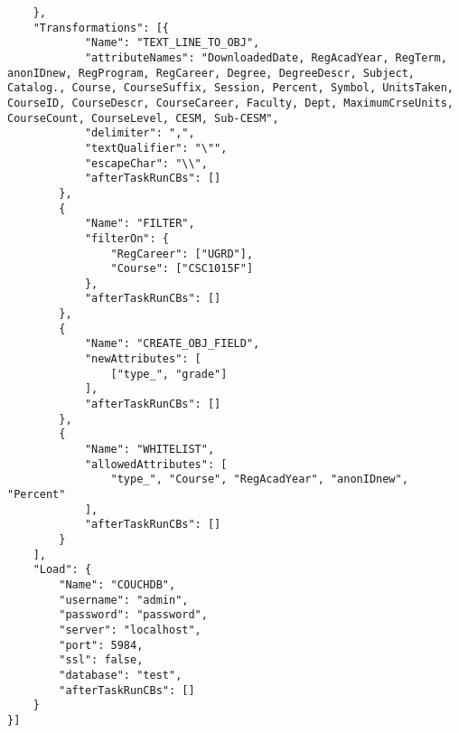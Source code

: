 \begin{verbatim}
    },
    "Transformations": [{
            "Name": "TEXT_LINE_TO_OBJ",
            "attributeNames": "DownloadedDate, RegAcadYear, RegTerm, anonIDnew, RegProgram, RegCareer, Degree, DegreeDescr, Subject, Catalog., Course, CourseSuffix, Session, Percent, Symbol, UnitsTaken, CourseID, CourseDescr, CourseCareer, Faculty, Dept, MaximumCrseUnits, CourseCount, CourseLevel, CESM, Sub-CESM",
            "delimiter": ",",
            "textQualifier": "\"",
            "escapeChar": "\\",
            "afterTaskRunCBs": []
        },
        {
            "Name": "FILTER",
            "filterOn": {
                "RegCareer": ["UGRD"],
                "Course": ["CSC1015F"]
            },
            "afterTaskRunCBs": []
        },
        {
            "Name": "CREATE_OBJ_FIELD",
            "newAttributes": [
                ["type_", "grade"]
            ],
            "afterTaskRunCBs": []
        },
        {
            "Name": "WHITELIST",
            "allowedAttributes": [
                "type_", "Course", "RegAcadYear", "anonIDnew", "Percent"
            ],
            "afterTaskRunCBs": []
        }
    ],
    "Load": {
        "Name": "COUCHDB",
        "username": "admin",
        "password": "password",
        "server": "localhost",
        "port": 5984,
        "ssl": false,
        "database": "test",
        "afterTaskRunCBs": []
    }
}]
\end{verbatim}